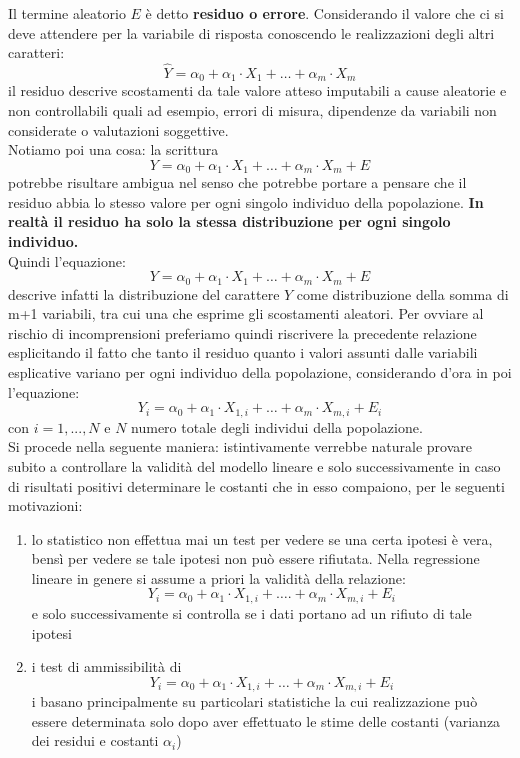 \documentclass[a4paper,12pt, oneside]{book}
\begin{document}
Il termine aleatorio $E$ è detto \textbf{residuo o errore}. Considerando il
valore che ci si deve attendere per la variabile di risposta conoscendo le
realizzazioni degli altri caratteri:
\[\hat{Y}=\alpha_{0}+\alpha_{1} \cdot X_{1}+\ldots+\alpha_{m} \cdot X_{m}\]
il residuo descrive scostamenti da tale valore atteso imputabili a cause aleatorie e
non controllabili quali ad esempio, errori di misura, dipendenze da variabili non
considerate o valutazioni soggettive.\\
Notiamo poi una cosa: la scrittura
\[Y=\alpha_{0}+\alpha_{1} \cdot X_{1}+\ldots+\alpha_{m} \cdot X_{m}+E\]
potrebbe risultare ambigua nel senso che potrebbe portare a pensare che il residuo
abbia lo stesso valore per ogni singolo individuo della popolazione.\textbf{ In realtà il
  residuo ha solo la stessa distribuzione per ogni singolo individuo.}\\
Quindi l'equazione:
\[Y=\alpha_{0}+\alpha_{1} \cdot X_{1}+\ldots+\alpha_{m} \cdot X_{m}+E\]
descrive infatti la distribuzione del carattere $Y$ come distribuzione della somma di
m+1 variabili, tra cui una che esprime gli scostamenti aleatori.
Per ovviare al rischio di incomprensioni preferiamo quindi riscrivere la precedente
relazione esplicitando il fatto che tanto il residuo quanto i valori assunti dalle variabili
esplicative variano per ogni individuo della popolazione, considerando d'ora in poi
l'equazione:
\[Y_{i}=\alpha_{0}+\alpha_{1} \cdot X_{1, i}+\ldots+\alpha_{m} \cdot X_{m, i}+E_{i}\]
con $i=1,...,N$ e $N$ numero totale degli individui della popolazione.\\
Si procede nella seguente maniera: istintivamente verrebbe naturale provare subito a controllare la validità
del modello lineare e solo successivamente in caso di risultati positivi determinare le
costanti che in esso compaiono, per le seguenti motivazioni:
\begin{enumerate}
\item lo statistico non effettua mai un test per vedere se
una certa ipotesi è vera, bensì per vedere se tale ipotesi non può essere rifiutata.
Nella regressione lineare in genere si assume a priori la validità della relazione:
\[Y_{i}=\alpha_{0}+\alpha_{1} \cdot X_{1, i}+\ldots .+\alpha_{m} \cdot X_{m, i}+E_{i}\]
e solo successivamente si controlla se i dati portano ad un rifiuto di tale ipotesi
\item i test di ammissibilità di
  \[Y_{i}=\alpha_{0}+\alpha_{1} \cdot X_{1, i}+\ldots+\alpha_{m} \cdot X_{m, i}+E_{i}\]
  i basano principalmente su particolari statistiche la cui realizzazione può essere
determinata solo dopo aver effettuato le stime delle costanti (varianza dei residui e
costanti $\alpha_i$)
\end{enumerate}
\end{document}
